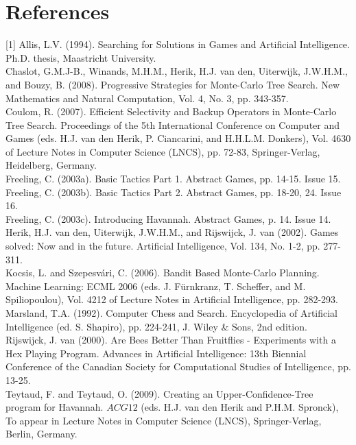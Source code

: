 \documentclass[10pt]{article}
\begin{document}
\section*{References}
[1] Allis, L.V. (1994). Searching for Solutions in Games and Artificial Intelligence. Ph.D. thesis, Maastricht University.\\
[2] Chaslot, G.M.J-B., Winands, M.H.M., Herik, H.J. van den, Uiterwijk, J.W.H.M., and Bouzy, B. (2008). Progressive Strategies for Monte-Carlo Tree Search. New Mathematics and Natural Computation, Vol. 4, No. 3, pp. 343-357.\\
[3] Coulom, R. (2007). Efficient Selectivity and Backup Operators in Monte-Carlo Tree Search. Proceedings of the 5th International Conference on Computer and Games (eds. H.J. van den Herik, P. Ciancarini, and H.H.L.M. Donkers), Vol. 4630 of Lecture Notes in Computer Science (LNCS), pp. 72-83, Springer-Verlag, Heidelberg, Germany.\\
[4] Freeling, C. (2003a). Basic Tactics Part 1. Abstract Games, pp. 14-15. Issue 15.\\
[5] Freeling, C. (2003b). Basic Tactics Part 2. Abstract Games, pp. 18-20, 24. Issue 16.\\
[6] Freeling, C. (2003c). Introducing Havannah. Abstract Games, p. 14. Issue 14.\\
[7] Herik, H.J. van den, Uiterwijk, J.W.H.M., and Rijswijck, J. van (2002). Games solved: Now and in the future. Artificial Intelligence, Vol. 134, No. 1-2, pp. 277-311.\\
[8] Kocsis, L. and Szepesvári, C. (2006). Bandit Based Monte-Carlo Planning. Machine Learning: ECML 2006 (eds. J. Fürnkranz, T. Scheffer, and M. Spiliopoulou), Vol. 4212 of Lecture Notes in Artificial Intelligence, pp. 282-293.\\
[9] Marsland, T.A. (1992). Computer Chess and Search. Encyclopedia of Artificial Intelligence (ed. S. Shapiro), pp. 224-241, J. Wiley \& Sons, 2nd edition.\\
[10] Rijswijck, J. van (2000). Are Bees Better Than Fruitflies - Experiments with a Hex Playing Program. Advances in Artificial Intelligence: 13th Biennial Conference of the Canadian Society for Computational Studies of Intelligence, pp. 13-25.\\
[11] Teytaud, F. and Teytaud, O. (2009). Creating an Upper-Confidence-Tree program for Havannah. $A C G 12$ (eds. H.J. van den Herik and P.H.M. Spronck), To appear in Lecture Notes in Computer Science (LNCS), Springer-Verlag, Berlin, Germany.
\end{document}
